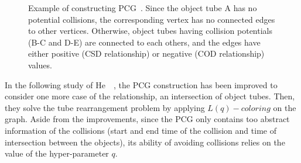 \documentclass[11pt]{hyu_thesis}
\begin{document}
\begin{figure}
	\centering
	\caption{Example of constructing PCG~\cite{He2017}. Since the object tube A has no potential collisions, the corresponding vertex has no connected edges to other vertices. Otherwise, object tubes having collision potentials (B-C and D-E) are connected to each others, and the edges have either positive (CSD relationship) or negative (COD relationship) values.}
	\label{fig:He}
\end{figure}

In the following study of He~\etal~\cite{He2017a}, the PCG construction has been improved to consider one more case of the relationship, an intersection of object tubes. Then, they solve the tube rearrangement problem by applying $L(q)-coloring$ on the graph. Aside from the improvements, since the PCG only contains too abstract information of the collisions (start and end time of the collision and time of intersection between the objects), its ability of avoiding collisions relies on the value of the hyper-parameter $q$.
\end{document}
